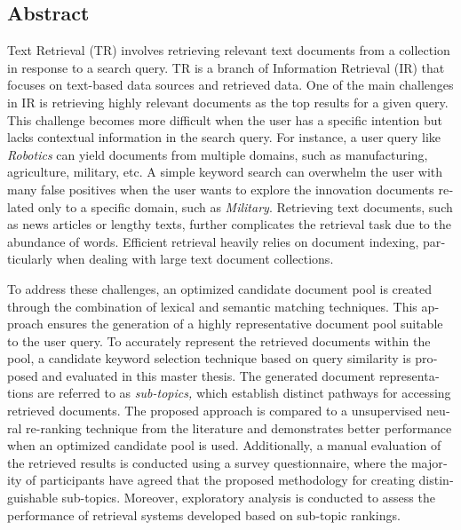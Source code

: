\begin{otherlanguage}{english}
    \section*{Abstract}

Text Retrieval (TR) involves retrieving relevant text documents from a collection in response to a search query. \ac{TR} is a branch of Information Retrieval (IR) that focuses on text-based data sources and retrieved data. One of the main challenges in \ac{IR} is retrieving highly relevant documents as the top results for a given query. This challenge becomes more difficult when the user has a specific intention but lacks contextual information in the search query. For instance, a user query like \emph{Robotics} can yield documents from multiple domains, such as manufacturing, agriculture, military, etc. A simple keyword search can overwhelm the user with many false positives when the user wants to explore the innovation documents related only to a specific domain, such as \emph{Military}. Retrieving text documents, such as news articles or lengthy texts, further complicates the retrieval task due to the abundance of words. Efficient retrieval heavily relies on document indexing, particularly when dealing with large text document collections.

To address these challenges, an optimized candidate document pool is created through the combination of lexical and semantic matching techniques. This approach ensures the generation of a highly representative document pool suitable to the user query. To accurately represent the retrieved documents within the pool, a candidate keyword selection technique based on query similarity is proposed and evaluated in this master thesis. The generated document representations are referred to as \emph{sub-topics,} which establish distinct pathways for accessing retrieved documents. The proposed approach is compared to a unsupervised neural re-ranking technique from the literature and demonstrates better performance when an optimized candidate pool is used. Additionally, a manual evaluation of the retrieved results is conducted using a survey questionnaire, where the majority of participants have agreed that the proposed methodology for creating distinguishable sub-topics. Moreover, exploratory analysis is conducted to assess the performance of retrieval systems developed based on sub-topic rankings.


\end{otherlanguage}
